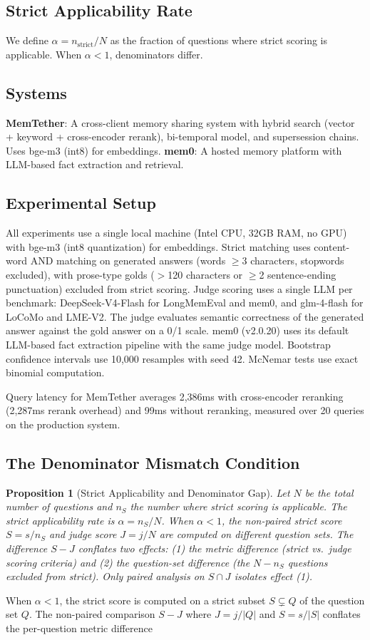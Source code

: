 \documentclass[sigconf,nonacm]{acmart}
\newtheorem{proposition}{Proposition}
\begin{document}
\subsection{Strict Applicability Rate}
We define $\alpha = n_{\text{strict}}/N$ as the fraction of questions where strict scoring is applicable. When $\alpha < 1$, denominators differ.

\subsection{Systems}
\textbf{MemTether}: A cross-client memory sharing system with hybrid search (vector + keyword + cross-encoder rerank), bi-temporal model, and supersession chains. Uses bge-m3 (int8) for embeddings.
\textbf{mem0}: A hosted memory platform with LLM-based fact extraction and retrieval.

\subsection{Experimental Setup}
All experiments use a single local machine (Intel CPU, 32GB RAM, no GPU) with bge-m3 (int8 quantization) for embeddings. Strict matching uses content-word AND matching on generated answers (words $\geq$3 characters, stopwords excluded), with prose-type golds ($>$120 characters or $\geq$2 sentence-ending punctuation) excluded from strict scoring. Judge scoring uses a single LLM per benchmark: DeepSeek-V4-Flash for LongMemEval and mem0, and glm-4-flash for LoCoMo and LME-V2. The judge evaluates semantic correctness of the generated answer against the gold answer on a 0/1 scale. mem0 (v2.0.20) uses its default LLM-based fact extraction pipeline with the same judge model. Bootstrap confidence intervals use 10{,}000 resamples with seed 42. McNemar tests use exact binomial computation.

Query latency for MemTether averages 2{,}386ms with cross-encoder reranking (2{,}287ms rerank overhead) and 99ms without reranking, measured over 20 queries on the production system.\subsection{The Denominator Mismatch Condition}

\begin{proposition}[Strict Applicability and Denominator Gap]
\label{prop:strictgap}
Let $N$ be the total number of questions and $n_S$ the number where strict scoring is applicable. The strict applicability rate is $\alpha = n_S / N$. When $\alpha < 1$, the non-paired strict score $S = s/n_S$ and judge score $J = j/N$ are computed on different question sets. The difference $S - J$ conflates two effects: (1) the metric difference (strict vs.\ judge scoring criteria) and (2) the question-set difference (the $N - n_S$ questions excluded from strict). Only paired analysis on $S \cap J$ isolates effect (1).
\end{proposition}
When $\alpha < 1$, the strict score is computed on a strict subset $S \subsetneq Q$ of the question set $Q$. The non-paired comparison $S - J$ where $J = j/|Q|$ and $S = s/|S|$ conflates the per-question metric difference
\end{document}
